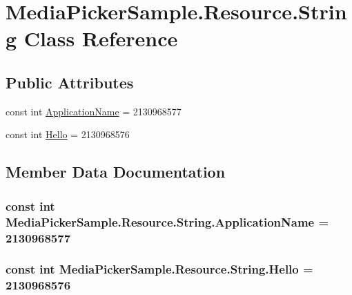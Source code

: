 \hypertarget{class_media_picker_sample_1_1_resource_1_1_string}{\section{Media\+Picker\+Sample.\+Resource.\+String Class Reference}
\label{class_media_picker_sample_1_1_resource_1_1_string}
}
\subsection*{Public Attributes}
\begin{DoxyCompactItemize}
\item 
const int \hyperlink{class_media_picker_sample_1_1_resource_1_1_string_a56f243f11b9d028d0c7e1844ac735548}{Application\+Name} = 2130968577
\item 
const int \hyperlink{class_media_picker_sample_1_1_resource_1_1_string_acdee215e3942f40549243c73ee38475c}{Hello} = 2130968576
\end{DoxyCompactItemize}


\subsection{Member Data Documentation}
\hypertarget{class_media_picker_sample_1_1_resource_1_1_string_a56f243f11b9d028d0c7e1844ac735548}{
\subsubsection[{Application\+Name}]{\setlength{\rightskip}{0pt plus 5cm}const int Media\+Picker\+Sample.\+Resource.\+String.\+Application\+Name = 2130968577}}\label{class_media_picker_sample_1_1_resource_1_1_string_a56f243f11b9d028d0c7e1844ac735548}
\hypertarget{class_media_picker_sample_1_1_resource_1_1_string_acdee215e3942f40549243c73ee38475c}{
\subsubsection[{Hello}]{\setlength{\rightskip}{0pt plus 5cm}const int Media\+Picker\+Sample.\+Resource.\+String.\+Hello = 2130968576}}\label{class_media_picker_sample_1_1_resource_1_1_string_acdee215e3942f40549243c73ee38475c}


